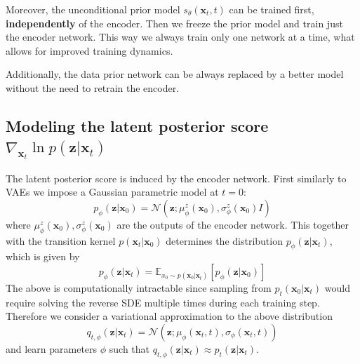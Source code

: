 Moreover, the unconditional prior model $s_\theta(\textbf{x}_t, t)$ can be trained first, \textbf{independently} of the encoder. Then we freeze the prior model and train just the encoder network. This way we always train only one network at a time, what allows for improved training dynamics.

Additionally, the data prior network can be always replaced by a better model without the need to retrain the encoder.


\subsection{Modeling the latent posterior score $\nabla_{\textbf{x}_t}  \ln{p(\textbf{z} | \textbf{x}_t )}$}
The latent posterior score is induced by the encoder network. First similarly to VAEs we impose a Gaussian parametric model at $t=0$:
\begin{equation*}
    p_\phi(\textbf{z} | \textbf{x}_0 ) = \mathcal{N}(\textbf{z} ; \mu^z_\phi(\textbf{x}_0), \sigma^z_\phi(\textbf{x}_0)I)
\end{equation*}
where $ \mu^z_\phi(\textbf{x}_0), \sigma^z_\phi(\textbf{x}_0)$ are the outputs of the encoder network.
This together with the transition kernel $p(\textbf{x}_t| \textbf{x}_0)$ determines the distribution $p_\phi(\textbf{z} | \textbf{x}_t)$, which is given by
\begin{equation}
\label{ch4:eq:true_posterior}
    p_\phi(\textbf{z} | \textbf{x}_t) = \mathbb{E}_{x_0 \sim p(\textbf{x}_0 | \textbf{x}_t)}[p_\phi( \textbf{z} | \textbf{x}_0)]
\end{equation}
The above is computationally intractable since sampling from $ p_t(\textbf{x}_0 | \textbf{x}_t)$ would require solving the reverse SDE multiple times during each training step. Therefore we consider a variational approximation to the above distribution 
\begin{equation}\label{ch4:definition_of_variational_approximation}
    q_{t, \phi}(\textbf{z}|\textbf{x}_t) =  \mathcal{N}(\textbf{z} ; \mu_\phi(\textbf{x}_t , t), \sigma_\phi(\textbf{x}_t, t))
\end{equation}
and learn parameters $\phi$ such that $q_{t, \phi}(\textbf{z}|\textbf{x}_t) \approx p_t(\textbf{z}|\textbf{x}_t)$.

